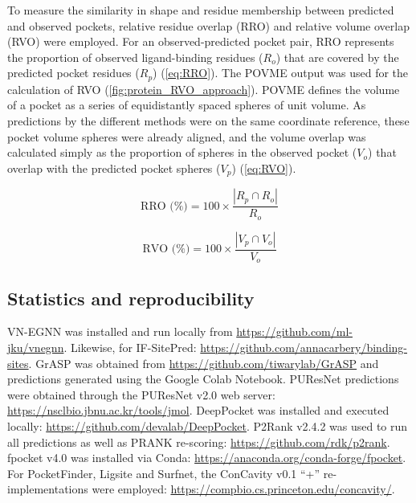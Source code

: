 \FloatBarrier

To measure the similarity in shape and residue membership between predicted and observed pockets, relative residue overlap (RRO) and relative volume overlap (RVO) were employed. For an observed-predicted pocket pair, RRO represents the proportion of observed ligand-binding residues ($R_{o}$) that are covered by the predicted pocket residues ($R_{p}$) (\autoref{eq:RRO}). The POVME output was used for the calculation of RVO (\autoref{fig:protein_RVO_approach}). POVME defines the volume of a pocket as a series of equidistantly spaced spheres of unit volume. As predictions by the different methods were on the same coordinate reference, these pocket volume spheres were already aligned, and the volume overlap was calculated simply as the proportion of spheres in the observed pocket ($V_{o}$) that overlap with the predicted pocket spheres ($V_{p}$) (\autoref{eq:RVO}).

\begin{equation}
\text{RRO (\%)} = 100 \times \frac{|R_p \cap R_o|}{R_o}
\label{eq:RRO}
\end{equation}

\begin{equation}
\text{RVO (\%)} = 100 \times \frac{|V_p \cap V_o|}{V_o}
\label{eq:RVO}
\end{equation}

\subsection{Statistics and reproducibility}

VN-EGNN was installed and run locally from \url{https://github.com/ml-jku/vnegnn}. Likewise, for IF-SitePred: \url{https://github.com/annacarbery/binding-sites}. GrASP was obtained from \url{https://github.com/tiwarylab/GrASP} and predictions generated using the Google Colab Notebook. PUResNet predictions were obtained through the PUResNet v2.0 web server: \url{https://nsclbio.jbnu.ac.kr/tools/jmol}. DeepPocket was installed and executed locally: \url{https://github.com/devalab/DeepPocket}. P2Rank v2.4.2 was used to run all predictions as well as PRANK re-scoring: \url{https://github.com/rdk/p2rank}. fpocket v4.0 was installed via Conda: \url{https://anaconda.org/conda-forge/fpocket}. For PocketFinder, Ligsite and Surfnet, the ConCavity v0.1 ``+'' re-implementations were employed: \url{https://compbio.cs.princeton.edu/concavity/}.

